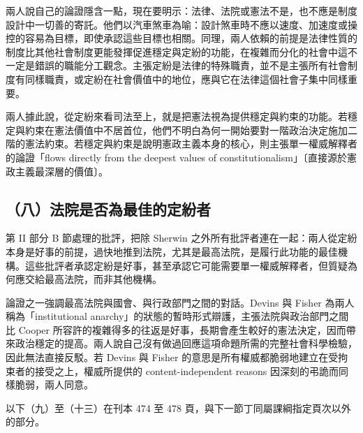 兩人說自己的論證隱含一點，現在要明示：法律、法院或憲法不是，也不應是制度設計中一切善的寄託。他們以汽車煞車為喻：設計煞車時不應以速度、加速度或操控的容易為目標，即使承認這些目標也相關。同理，兩人依賴的前提是法律性質的制度比其他社會制度更能發揮促進穩定與定紛的功能，在複雜而分化的社會中這不一定是錯誤的職能分工觀念。主張定紛是法律的特殊職責，並不是主張所有社會制度有同樣職責，或定紛在社會價值中的地位，應與它在法律這個社會子集中同樣重要。

兩人據此說，從定紛來看司法至上，就是把憲法視為提供穩定與約束的功能。若穩定與約束在憲法價值中不居首位，他們不明白為何一開始要對一階政治決定施加二階的憲法約束。若穩定與約束是說明憲政主義本身的核心，則主張單一權威解釋者的論證「flows directly from the deepest values of constitutionalism」〔直接源於憲政主義最深層的價值〕。

\subsection{（八）法院是否為最佳的定紛者}

第 II 部分 B 節處理的批評，把除 Sherwin 之外所有批評者連在一起：兩人從定紛本身是好事的前提，過快地推到法院，尤其是最高法院，是履行此功能的最佳機構。這些批評者承認定紛是好事，甚至承認它可能需要單一權威解釋者，但質疑為何應交給最高法院，而非其他機構。

論證之一強調最高法院與國會、與行政部門之間的對話。Devins 與 Fisher 為兩人稱為「institutional anarchy」的狀態的暫時形式辯護，主張法院與政治部門之間比 Cooper 所容許的複雜得多的往返是好事，長期會產生較好的憲法決定，因而帶來政治穩定的提高。兩人說自己沒有做過回應這項命題所需的完整社會科學檢驗，因此無法直接反駁。若 Devins 與 Fisher 的意思是所有權威都脆弱地建立在受拘束者的接受之上，權威所提供的 content-independent reasons 因深刻的弔詭而同樣脆弱，兩人同意。

以下（九）至（十三）在刊本 474 至 478 頁，與下一節丁同屬課綱指定頁次以外的部分。

